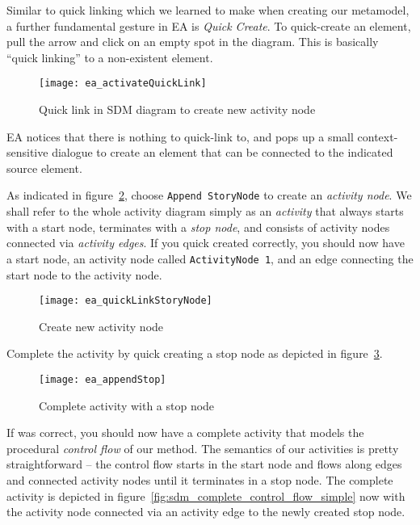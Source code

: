 Similar to quick linking which we learned to make when creating our metamodel, a further fundamental gesture in EA is \emph{Quick Create}.
To quick-create an element, pull the arrow and click on an empty spot in the diagram. This is basically ``quick linking'' to a non-existent element.

\begin{figure}[htp]
\begin{center}
  \texttt{[image: ea\_activateQuickLink]}
  \caption{Quick link in SDM diagram to create new activity node}  
  \label{fig:sdm_quicklink}
\end{center}
\end{figure}

EA notices that there is nothing to quick-link to, and pops up a small context-sensitive dialogue to create an element that can be connected to the indicated
source element.

As indicated in figure~\ref{fig:sdm_new_activity_node}, choose \texttt{Append StoryNode} to create an \emph{activity node}. We
 shall refer to the whole activity diagram simply as an \emph{activity} that always starts with a start node, terminates with a \emph{stop%
node}, and consists of activity nodes connected via \emph{activity edges}. If you quick created correctly, you should now have a start node,
an activity node called \texttt{ActivityNode 1}, and an edge connecting the start node to the activity node.

\begin{figure}[htp]
\begin{center}
  \texttt{[image: ea\_quickLinkStoryNode]}
  \caption{Create new activity node}  
  \label{fig:sdm_new_activity_node}
\end{center}
\end{figure}

Complete the activity by quick creating a stop node as depicted in figure~\ref{fig:sdm_stop_node}.

\begin{figure}[htp]
\begin{center}
  \texttt{[image: ea\_appendStop]}
  \caption{Complete activity with a stop node}  
  \label{fig:sdm_stop_node}
\end{center}
\end{figure}

If was correct, you should now have a complete activity that models the procedural \emph{control flow} of our method.  The semantics of our
activities is pretty straightforward -- the control flow starts in the start node and flows along edges and connected activity nodes until it terminates in a
stop node.  The complete activity is depicted in figure~\ref{fig:sdm_complete_control_flow_simple} now with the activity node connected via an activity edge to
the newly created stop node.

